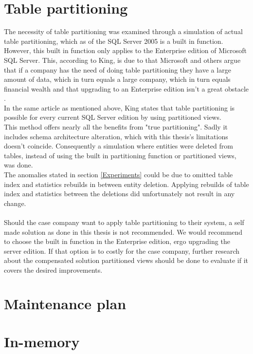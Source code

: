 \documentclass{cslthse-msc}
\begin{document}
\section{Table partitioning}
The necessity of table partitioning was examined through a simulation of actual table partitioning, which as of the SQL Server 2005 is a built in function. However, this built in function only applies to the Enterprise edition of Microsoft SQL Server. This, according to King, is due to that Microsoft and others argue that if a company has the need of doing table partitioning they have a large amount of data, which in turn equals a large company, which in turn equals financial wealth and that upgrading to an Enterprise edition isn't a great obstacle \cite{partitionwoEnterprise}. \\ In the same article as mentioned above, King states that table partitioning is possible for every current SQL Server edition by using partitioned views.\\ This method offers nearly all the benefits from "true partitioning". Sadly it includes schema architecture alteration, which with this thesis's limitations doesn't coincide. Consequently a simulation where entities were deleted from tables, instead of using the built in partitioning function or partitioned views, was done.\\
The anomalies stated in section \ref{Experiments} could be due to omitted table index and statistics rebuilds in between entity deletion. Applying rebuilds of table index and statistics between the deletions did unfortunately not result in any change. \\\\
Should the case company want to apply table partitioning to their system, a self made solution as done in this thesis is not recommended. We would recommend to choose the built in function in the Enterprise edition, ergo upgrading the server edition. If that option is to costly for the case company, further research about the compensated solution partitioned views should be done to evaluate if it covers the desired improvements. 
\section{Maintenance plan}

\section{In-memory}
\end{document}
